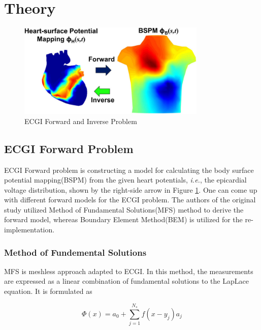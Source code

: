 \documentclass[draftcls, onecolumn, journal]{IEEEtran}
\begin{document}
\clearpage

\section{Theory}\label{sec:theory}

\begin{figure}[h]
    \centering
    \includegraphics[width=0.8\textwidth]{../images/The-illustration-of-forward-and-inverse-ECG-problems.png}
    \caption{ECGI Forward and Inverse Problem}\label{fig:ECG}
\end{figure}

\subsection{ECGI Forward Problem}\label{subsec:ecgfor}

\indent ECGI Forward problem is constructing a model for calculating the body surface potential mapping(BSPM) from the given heart potentials, \textit{i.e.}, the epicardial voltage distribution, shown by the right-side arrow in Figure \ref{fig:ECG}. One can come up with different forward models for the ECGI problem. The authors of the original study utilized Method of Fundamental Solutions(MFS) method to derive the forward model, whereas Boundary Element Method(BEM) is utilized for the re-implementation. 

\subsubsection*{Method of Fundemental Solutions}
\indent MFS is meshless approach adapted to ECGI. In this method, the measurements are expressed as a linear combination of fundamental solutions to the LapLace equation. It is formulated as

\begin{equation}
    \Phi (x) = a_0 + \sum\limits_{j=1}^{N_s} f(x-y_j)a_j
    \label{eq:MFS}
\end{equation}
\end{document}
